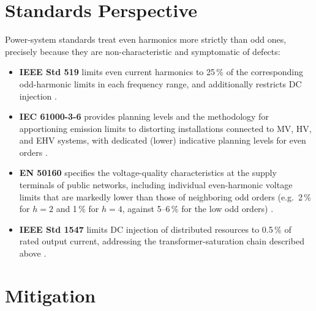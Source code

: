 \documentclass[11pt,a4paper]{article}
\begin{document}
\section{Standards Perspective}

Power-system standards treat even harmonics more strictly than odd ones,
precisely because they are non-characteristic and symptomatic of defects:
%
\begin{itemize}
\item \textbf{IEEE Std 519} limits even current harmonics to 25\,\% of the
corresponding odd-harmonic limits in each frequency range, and additionally
restricts DC injection \cite{ieee519}.
\item \textbf{IEC 61000-3-6} provides planning levels and the methodology for
apportioning emission limits to distorting installations connected to MV, HV,
and EHV systems, with dedicated (lower) indicative planning levels for even
orders \cite{iec61000_3_6}.
\item \textbf{EN 50160} specifies the voltage-quality characteristics at the
supply terminals of public networks, including individual even-harmonic voltage
limits that are markedly lower than those of neighboring odd orders (e.g.\
2\,\% for $h=2$ and 1\,\% for $h=4$, against 5--6\,\% for the low odd orders)
\cite{en50160}.
\item \textbf{IEEE Std 1547} limits DC injection of distributed resources to
0.5\,\% of rated output current, addressing the transformer-saturation chain
described above \cite{ieee1547}.
\end{itemize}

\section{Mitigation}
\end{document}
